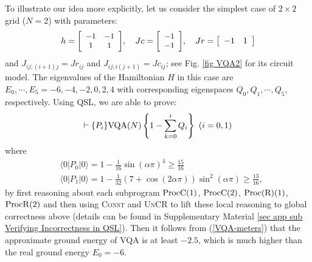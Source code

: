 \documentclass[conference,compsoc, 10pt]{IEEEtran}
\def\>{\ensuremath{\rangle}}
\def\<{\ensuremath{\langle}}
\providecommand{\todo}[1]{{\protect\color{red}\noindent {\bf [todo]}\emph{#1} {\bf [/todo]}}}
\begin{document}
	To illustrate our idea more explicitly, let us consider the simplest case of $2\times 2$ grid ($N = 2$) with parameters:
	$$h = {\small\left[\begin{array}{cc}-1 & -1 \\ 1 & 1\end{array}\right]},\quad Jc = {\small\left[\begin{array}{c}-1 \\ -1\end{array}\right]},\quad Jr = \left[\begin{array}{cc}-1 & 1\end{array}\right]$$
	and $J_{ij;(i+1)j} = Jr_{ij}$ and $J_{ij;i(j+1)} = Jc_{ij}$; see Fig. \ref{fig VQA2} for its circuit model.
	The eigenvalues of the Hamiltonian $H$ in this case are $E_0,\cdots,E_5 =
  -6,-4,-2,0,2,4$ with corresponding eigenspaces $Q_0,Q_1,\cdots,Q_5$,
  respectively.  Using QSL, we are able to prove:
  \[
    \vdash \{P_i\} {\rm VQA}(N) \left\{1-\sum_{k=0}^{i}Q_i\right\}\ (i=0,1)
  \]
  where
  \begin{align*}
  &\<0|P_0|0\> = 1-\frac{1}{16}\sin(\alpha\pi)^4 \ge \frac{15}{16}\\
  &\<0|P_1|0\> = 1-\frac{1}{32}(7+\cos(2\alpha\pi))\sin^2(\alpha\pi)\ge \frac{13}{16},
  \end{align*}
	by first reasoning about each subprogram ${\rm ProcC}(1)$, ${\rm ProcC}(2)$, ${\rm Proc(R)}(1)$, ${\rm ProcR}(2)$ and then using \textsc{Const} and \textsc{UnCR} to lift these local reasoning to global correctness above (details can be found in Supplementary Material \ref{sec app sub Verifying Incorrectness in QSL}).
	Then it follows from (\ref{VQA-meters}) that the approximate ground energy of VQA is at least $-2.5$, which is much higher than the real ground energy $E_0 = -6$.
\end{document}
